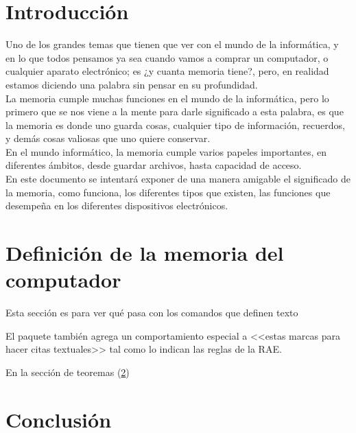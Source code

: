 \documentclass[10pt,letterpaper]{article}
\begin{document}
\tableofcontents

\newpage
\section{Introducción}

\begin{justify}
	Uno de los grandes temas que tienen que ver con el mundo de la informática, y en lo que todos pensamos ya sea cuando vamos a comprar un computador, o cualquier aparato electrónico; es ¿y cuanta memoria tiene?, pero, en realidad estamos diciendo una palabra sin pensar en su profundidad.\\
	
	\noindent
	La memoria cumple muchas funciones en el mundo de la informática, pero lo primero que se nos viene a la mente para darle significado a esta palabra, es que la memoria es donde uno guarda cosas, cualquier tipo de información, recuerdos, y demás cosas valiosas que uno quiere conservar.\\
	
	\noindent
	En el mundo informático, la memoria cumple varios papeles importantes, en diferentes ámbitos, desde guardar archivos, hasta capacidad de acceso.\\
	
	\noindent
	En este documento se intentará exponer de una manera amigable el significado de la memoria, como funciona, los diferentes tipos que existen, las funciones que desempeña en los diferentes dispositivos electrónicos.
\end{justify}

\newpage
\section{Definición de la memoria del computador} \label{contenido}

Esta sección es para ver qué pasa con los comandos 
que definen texto

El paquete también agrega un comportamiento especial 
a <<estas marcas para hacer citas textuales>> tal como 
lo indican las reglas de la RAE. \cite{dirac}




En la sección de teoremas (\ref{contenido})

\noindent
\section{Conclusión} \label{conclusion}


	

\newpage
\noindent








	
	
	
\end{document}
